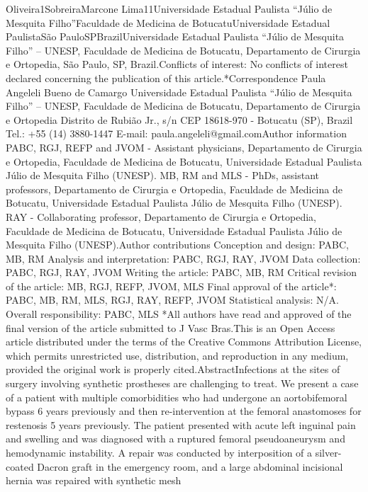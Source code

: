 \documentclass[numberinsection,times,10pt,spreadimages]{memoir}
\begin{document}
Oliveira1SobreiraMarcone Lima11Universidade Estadual Paulista “Júlio de
Mesquita Filho”Faculdade de Medicina de
BotucatuUniversidade Estadual
PaulistaSão PauloSPBrazilUniversidade Estadual Paulista “Júlio de
Mesquita Filho” – UNESP, Faculdade de Medicina de Botucatu, Departamento de
Cirurgia e Ortopedia, São Paulo, SP, Brazil.Conflicts of interest: No conflicts
of interest declared concerning the
publication of this article.*Correspondence Paula Angeleli Bueno de Camargo
Universidade
Estadual Paulista “Júlio de Mesquita Filho” – UNESP, Faculdade de Medicina de
Botucatu, Departamento de Cirurgia e Ortopedia Distrito de Rubião Jr., s/n CEP
18618-970 - Botucatu (SP), Brazil Tel.: +55 (14) 3880-1447 E-mail:
paula.angeleli@gmail.comAuthor information PABC, RGJ, REFP and JVOM - Assistant
physicians,
Departamento de Cirurgia e Ortopedia, Faculdade de Medicina de Botucatu,
Universidade Estadual Paulista Júlio de Mesquita Filho (UNESP). MB, RM and
MLS - PhDs, assistant professors, Departamento de Cirurgia e Ortopedia,
Faculdade de Medicina de Botucatu, Universidade Estadual Paulista Júlio de
Mesquita Filho (UNESP). RAY - Collaborating professor, Departamento de
Cirurgia e Ortopedia, Faculdade de Medicina de Botucatu, Universidade
Estadual Paulista Júlio de Mesquita Filho (UNESP).Author contributions
Conception and design: PABC, MB, RM Analysis and
interpretation: PABC, RGJ, RAY, JVOM Data collection: PABC, RGJ, RAY, JVOM
Writing the article: PABC, MB, RM Critical revision of the article: MB, RGJ,
REFP, JVOM, MLS Final approval of the article*: PABC, MB, RM, MLS, RGJ, RAY,
REFP, JVOM Statistical analysis: N/A. Overall responsibility: PABC, MLS *All
authors have read and approved of the final version of the article submitted
to J Vasc Bras.This is an Open Access article distributed under the terms of the
Creative Commons Attribution License, which permits unrestricted use,
distribution, and reproduction in any medium, provided the original work is
properly cited.AbstractInfections at the sites of surgery involving synthetic
prostheses are challenging
to treat. We present a case of a patient with multiple comorbidities who had
undergone an aortobifemoral bypass 6 years previously and then re-intervention
at the femoral anastomoses for restenosis 5 years previously. The patient
presented with acute left inguinal pain and swelling and was diagnosed with a
ruptured femoral pseudoaneurysm and hemodynamic instability. A repair was
conducted by interposition of a silver-coated Dacron graft in the emergency
room, and a large abdominal incisional hernia was repaired with synthetic mesh
\end{document}
